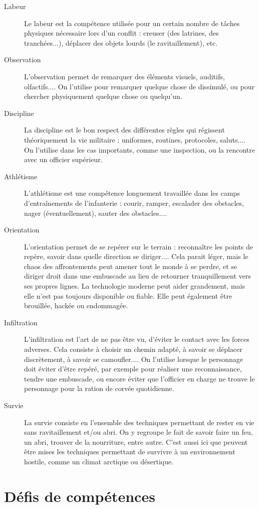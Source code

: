 \documentclass{report}
\begin{document}
\begin{multicols}{2}
\begin{description}
    \item[Labeur] Le labeur est la compétence utilisée pour un certain nombre de tâches physiques nécessaire lors d'un conflit : creuser (des latrines, des tranchées...), déplacer des objets lourds (le ravitaillement), etc.
    \item[Observation] L'observation permet de remarquer des éléments visuels, auditifs, olfactifs.... On l'utilise pour remarquer quelque chose de dissimulé, ou pour chercher physiquement quelque chose ou quelqu'un.
    \item[Discipline] La discipline est le bon respect des différentes règles qui régissent théoriquement la vie militaire : uniformes, routines, protocoles, saluts.... On l'utilise dans les cas importants, comme une inspection, ou la rencontre avec un officier supérieur.
    \item[Athlétisme] L'athlétisme est une compétence longuement travaillée dans les camps d'entraînements de l'infanterie : courir, ramper, escalader des obstacles, nager (éventuellement), sauter des obstacles.... 
    \item[Orientation] L'orientation permet de se repérer sur le terrain : reconnaître les points de repère, savoir dans quelle direction se diriger.... Cela parait léger, mais le chaos des affrontements peut amener tout le monde à se perdre, et se diriger droit dans une embuscade au lieu de retourner tranquillement vers ses propres lignes. La technologie moderne peut aider grandement, mais elle n'est pas toujours disponible ou fiable. Elle peut également être brouillée, hackée ou endommagée.
    \item[Infiltration]L'infiltration est l'art de ne pas être vu, d'éviter le contact avec les forces adverses. Cela consiste à choisir un chemin adapté, à savoir se déplacer discrètement, à savoir se camoufler.... On l'utilise lorsque le personnage doit éviter d'être repéré, par exemple pour réaliser une reconnaissance, tendre une embuscade, ou encore éviter que l'officier en charge ne trouve le personnage pour la ration de corvée quotidienne.
    \item[Survie] La survie consiste en l'ensemble des techniques permettant de rester en vie sans ravitaillement et/ou abri. On y regroupe le fait de savoir faire un feu, un abri, trouver de la nourriture, entre autre. C'est aussi ici que peuvent être mises les techniques permettant de survivre à un environnement hostile, comme un climat arctique ou désertique.
\end{description}
\section{Défis de compétences}

\end{multicols}
\end{document}
